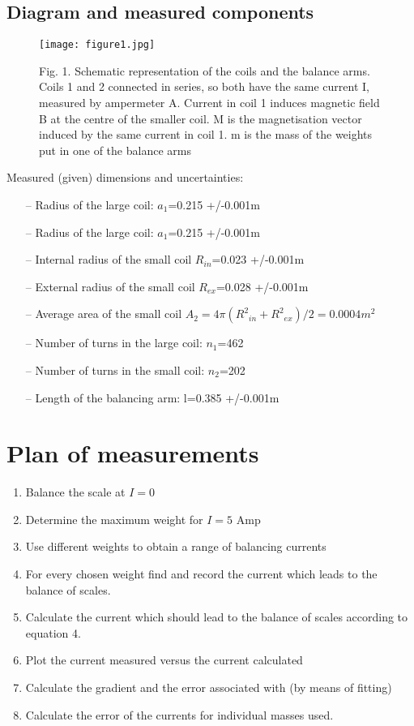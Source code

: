 \documentclass[twocolumn]{article}
\begin{document}
\subsection{Diagram and measured components}
\begin{figure}[H]
\centering
\texttt{[image: figure1.jpg]}
\caption{Fig. 1. Schematic representation of the coils and the balance arms. Coils 1 and 2 connected in series, so both have the same current I, measured by ampermeter A. Current in coil 1 induces magnetic field B at the centre of the smaller coil. M is the magnetisation vector induced by the same current in coil 1. m is the mass of the weights put in one
of the balance arms}
 \label{fig:figure1}
\end{figure}
Measured (given) dimensions and uncertainties:
\begin{itemize}
\setlength{\itemsep}{1pt}
\setlength{\parskip}{0pt}
\setlength{\parsep}{0pt}
\item[--] Radius of the large coil: $a_1$=0.215 +/-0.001m
\item[--] Radius of the large coil: $a_1$=0.215 +/-0.001m
\item[--] Internal radius of the small coil $R_{in}$=0.023 +/-0.001m
\item[--] External radius of the small coil $R_{ex}$=0.028 +/-0.001m
\item[--] Average area of the small coil $A_2=4\pi({R^2}_{in}+{R^2}_{ex})/2=0.0004m^2$
\item[--] Number of turns in the large coil: $n_1$=462
\item[--] Number of turns in the small coil: $n_2$=202
\item[--] Length of the balancing arm: l=0.385 +/-0.001m
\end{itemize}

\section{Plan of measurements}
\begin{enumerate} 
\setlength{\itemsep}{1pt}
\setlength{\parskip}{0pt}
\setlength{\parsep}{0pt}
\item Balance the scale at $I=0$
\item Determine the maximum weight for $I=5$ Amp 
\item Use different weights to obtain a range of balancing currents
\item For every chosen weight find and record the current which leads to the balance of
scales.
\item Calculate the current which should lead to the balance of scales according to equation 4.
\item Plot the current measured versus the current calculated
\item Calculate the gradient and the error associated with (by means of fitting)
\item Calculate the error of the currents for individual masses used.
\end{enumerate}
\end{document}
